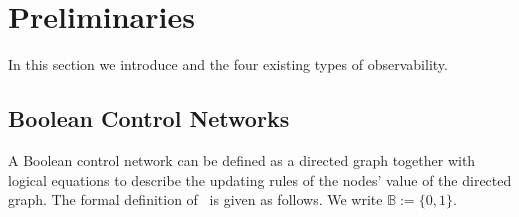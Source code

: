 \section{Preliminaries} 
\label{sec:pre}
In this section we introduce {\BCNs} and the four existing types of observability. 

\subsection{Boolean Control Networks}

A Boolean control network can be defined as a directed graph together with logical equations to describe the updating rules of the nodes' value of the directed graph. The formal definition of \BCN\ is given as follows. We write $\mathbb{B}:=\{0,1\}$.

